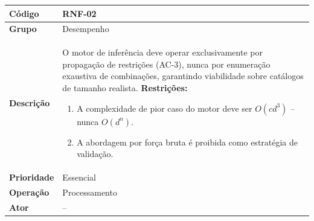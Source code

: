 \FloatBarrier
\begin{quadro}[htb]
  \caption{RNF-02 -- Ausência de avaliação por força bruta}
  \label{quad:rnf02}
  \begin{tabular}{|p{3.2cm}|p{11.8cm}|}
    \hline
    \textbf{Código}     & RNF-02                                                             \\ \hline
    \textbf{Grupo}      & Desempenho                                                         \\ \hline
    \textbf{Descrição}  &
    O motor de inferência deve operar exclusivamente por propagação de restrições (AC-3), nunca por enumeração exaustiva de combinações, garantindo viabilidade sobre catálogos de tamanho realista.
    \textbf{Restrições:}
    \begin{enumerate}[nosep,leftmargin=1.2em,topsep=2pt,partopsep=0pt,parsep=0pt,itemsep=1pt]
      \item A complexidade de pior caso do motor deve ser $O(cd^{3})$ -- nunca $O(d^{n})$.
      \item A abordagem por força bruta é proibida como estratégia de validação.
    \end{enumerate} \\ \hline
    \textbf{Prioridade} & Essencial                                                          \\ \hline
    \textbf{Operação}   & Processamento                                                      \\ \hline
    \textbf{Ator}       & --                                                                 \\ \hline
  \end{tabular}
\end{quadro}

